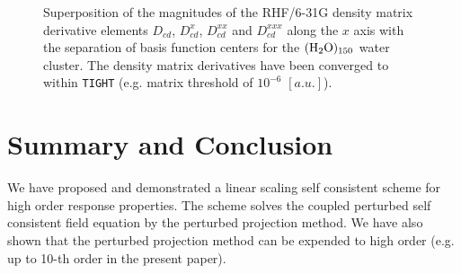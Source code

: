 \documentclass[prl,aps,letterpaper,twocolumn,showpacs,twocolumngrid,superbib]{revtex4}
\begin{document}
\begin{figure}[t]
  \caption{\protect
    Superposition of the magnitudes of the RHF/6-31G density matrix
    derivative elements $D_{cd}$, $D^{x}_{cd}$, $D^{xx}_{cd}$ and $D^{xxx}_{cd}$
    along the $x$ axis with the separation of basis function centers
    for the $\rm (H_2O)_{150}$ water cluster. The density matrix 
    derivatives have been converged to within {\tt TIGHT} (e.g. 
    matrix threshold of $10^{-6}$ $[a.u.]$).
  }\label{fig:Superposition_Decay}
\end{figure}

\section{Summary and Conclusion}
 We have proposed and demonstrated a linear scaling self
 consistent scheme for high order response properties.
 The scheme solves the coupled perturbed self consistent field 
 equation by the perturbed projection method. We have also shown
 that the perturbed projection method can be expended to high
 order (e.g. up to 10-th order in the present paper).
\end{document}
